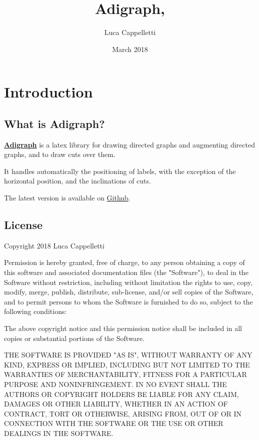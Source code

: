 \documentclass{report}
\title{Adigraph, \AdigraphVersionNumber}
\author{Luca Cappelletti}
\date{March 2018}
\begin{document}
\maketitle

{\hypersetup{hidelinks}
	\tableofcontents  %
}

\chapter{Introduction}
\section{What is Adigraph?}
\textbf{\href{https://ctan.org/pkg/adigraph}{Adigraph}} is a latex library for drawing directed graphs and augmenting directed graphs, and to draw cuts over them.

It handles automatically the positioning of labels, with the exception of the horizontal position, and the inclinations of cuts.

The latest version is available on \href{https://github.com/LucaCappelletti94/adigraph}{Github}.

\section{License}
Copyright 2018 Luca Cappelletti

Permission is hereby granted, free of charge, to any person obtaining a copy of this software and associated documentation files (the "Software"), to deal in the Software without restriction, including without limitation the rights to use, copy, modify, merge, publish, distribute, sub-license, and/or sell copies of the Software, and to permit persons to whom the Software is furnished to do so, subject to the following conditions:

The above copyright notice and this permission notice shall be included in all copies or substantial portions of the Software.

THE SOFTWARE IS PROVIDED "AS IS", WITHOUT WARRANTY OF ANY KIND, EXPRESS OR IMPLIED, INCLUDING BUT NOT LIMITED TO THE WARRANTIES OF MERCHANTABILITY, FITNESS FOR A PARTICULAR PURPOSE AND NONINFRINGEMENT. IN NO EVENT SHALL THE AUTHORS OR COPYRIGHT HOLDERS BE LIABLE FOR ANY CLAIM, DAMAGES OR OTHER LIABILITY, WHETHER IN AN ACTION OF CONTRACT, TORT OR OTHERWISE, ARISING FROM, OUT OF OR IN CONNECTION WITH THE SOFTWARE OR THE USE OR OTHER DEALINGS IN THE SOFTWARE.\\
\end{document}

